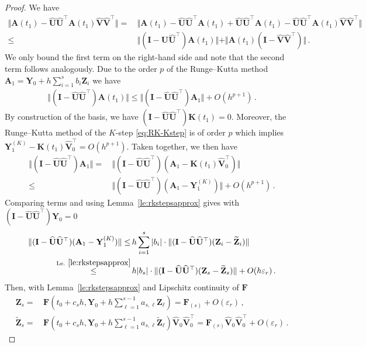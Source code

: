 \documentclass[preprint,runningheads]{svjour3}
\def\wh{\widehat}
\newcommand\bfI{{\mathbf I}}
\newcommand\bfA{{\mathbf A}}
\newcommand\bfF{{\mathbf F}}
\newcommand\bfK{{\mathbf K}}
\newcommand\bfU{{\mathbf U}}
\newcommand\bfV{{\mathbf V}}
\newcommand\bfY{{\mathbf Y}}
\newcommand\bfZ{{\mathbf Z}}
\begin{document}
\begin{proof}
We have 
\begin{align*}
    \Vert \bfA(t_1) - \wh \bfU\wh \bfU^{\top}\bfA(t_1)\wh \bfV\wh \bfV^{\top} \Vert =\,& \Vert \bfA(t_1) - \wh \bfU\wh \bfU^{\top}\bfA(t_1) + \wh \bfU\wh \bfU^{\top}\bfA(t_1)-\wh \bfU\wh \bfU^{\top}\bfA(t_1)\wh \bfV\wh \bfV^{\top} \Vert\\
    \leq\,& \Vert (\bfI - \wh \bfU\wh \bfU^{\top})\bfA(t_1)\Vert + \Vert \bfA(t_1)(\bfI-\wh \bfV\wh \bfV^{\top}) \Vert\,.
\end{align*}
We only bound the first term on the right-hand side and note that the second term follows analogously. Due to the order $p$ of the Runge--Kutta method $\bfA_1 = \bfY_0 + h\sum_{i=1}^s b_i \bfZ_i$ we have
\begin{align*}
    \Vert (\bfI - \wh \bfU\wh \bfU^{\top})\bfA(t_1)\Vert \leq \Vert (\bfI - \wh \bfU\wh \bfU^{\top})\bfA_1\Vert + O(h^{p+1})\,.
\end{align*}
By construction of the basis, we have $(\bfI-\wh \bfU\wh \bfU^{\top})\bfK(t_1) = 0$. Moreover, the Runge--Kutta method of the $K$-step \eqref{eq:RK-Kstep} is of order $p$ which implies $\bfY_1^{(K)} - \bfK(t_1)\wh \bfV_0^{\top} = O(h^{p+1})$. Taken together, we then have
\begin{align*}
    \Vert (\bfI - \wh \bfU\wh \bfU^{\top})\bfA_1\Vert =\,& \Vert (\bfI - \wh \bfU\wh \bfU^{\top})(\bfA_1-\bfK(t_1)\wh \bfV_0^{\top})\Vert\\
    \leq\,&\Vert (\bfI - \wh \bfU\wh \bfU^{\top})(\bfA_1-\bfY^{(K)}_1)\Vert + O(h^{p+1})\,.
\end{align*}
Comparing terms and using Lemma~\ref{le:rkstepsapprox} gives with $(\bfI-\wh \bfU\wh \bfU^{\top})\bfY_0 = 0$
\begin{align*}
    \Vert (\bfI-\wh \bfU\wh \bfU^{\top})(\bfA_1 -  \bfY^{(K)}_1) \Vert \leq\,& h\sum_{i=1}^s |b_i| \cdot \Vert (\bfI-\wh \bfU\wh \bfU^{\top})(\bfZ_i - \widetilde \bfZ_i) \Vert \\
    \stackrel{\mathrm{Le.~\ref{le:rkstepsapprox}}}{\leq}\,& h |b_s| \cdot \Vert (\bfI-\wh \bfU\wh \bfU^{\top})(\bfZ_s - \widetilde \bfZ_s) \Vert +O(h\varepsilon_r)\,.
\end{align*}
Then, with Lemma~\ref{le:rkstepsapprox} and Lipschitz continuity of $\bfF$
\begin{align*}
    \bfZ_s =\,& \bfF(t_0 + c_s h, \bfY_0 + h\sum_{\ell = 1}^{s-1}a_{s,\ell} \bfZ_{\ell}) = \bfF_{(s)} + O(\varepsilon_r)\,,\\
    \widetilde \bfZ_s =\,& \bfF(t_0 + c_s h, \bfY_0 + h\sum_{\ell = 1}^{s-1}a_{s,\ell} \widetilde \bfZ_{\ell})\wh \bfV_0\wh \bfV_0^{\top} = \bfF_{(s)}\wh \bfV_0\wh \bfV_0^{\top} + O(\varepsilon_r)\,.

\end{align*}
\end{proof}
\end{document}

